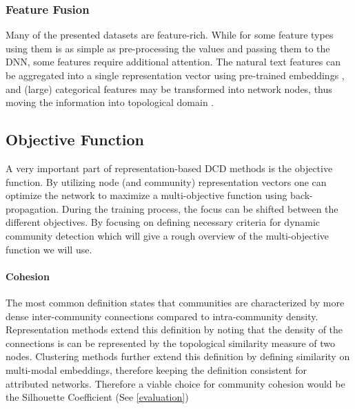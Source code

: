 \documentclass[
acmsmall,
nonacm,
screen,
acmthm]{../../scripts/pandoc/templates/acmart}
\begin{document}
\hypertarget{feature-fusion}{%
\subsubsection{Feature Fusion}\label{feature-fusion}}

Many of the presented datasets are feature-rich. While for some feature
types using them is as simple as pre-processing the values and passing
them to the DNN, some features require additional attention. The natural
text features can be aggregated into a single representation vector
using pre-trained embeddings
\citep{devlinBERTPretrainingDeep2019, penningtonGloveGlobalVectors2014},
and (large) categorical features may be transformed into network nodes,
thus moving the information into topological domain
\citep{chenCatGCNGraphConvolutional2021, wuTopologicalMachineLearning2020}.

\hypertarget{objective-function}{%
\subsection{Objective Function}\label{objective-function}}

A very important part of representation-based DCD methods is the
objective function. By utilizing node (and community) representation
vectors one can optimize the network to maximize a multi-objective
function using back-propagation. During the training process, the focus
can be shifted between the different objectives. By focusing on defining
necessary criteria for dynamic community detection which will give a
rough overview of the multi-objective function we will use.

\hypertarget{cohesion}{%
\paragraph{Cohesion}\label{cohesion}}

The most common definition states that communities are characterized by
more dense inter-community connections compared to intra-community
density. Representation methods extend this definition by noting that
the density of the connections is can be represented by the topological
similarity measure of two nodes. Clustering methods further extend this
definition by defining similarity on multi-modal embeddings, therefore
keeping the definition consistent for attributed networks. Therefore a
viable choice for community cohesion would be the Silhouette Coefficient
(See \cref{evaluation})
\end{document}
